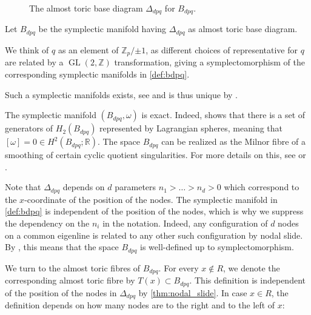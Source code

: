 \documentclass[AIF,Unicode,manuscript]{cedram}
\DeclareMathOperator{\GL}{GL}
\begin{document}
\begin{figure}
\centering
{}   
\caption{The almost toric base diagram $Δ_{dpq}$ for $B_{dpq}$.}
\label{fig:Bdpq_moment_image}
\end{figure}

\begin{definition}
    \label{def:bdpq}
    Let $B_{dpq}$ be the symplectic manifold having $\Delta_{dpq}$ as almost toric base diagram.
\end{definition}

We think of $q$ as an element of $ℤ_p/{±1}$, as different choices of representative for $q$ are related by a $\GL(2,ℤ)$ transformation, giving a symplectomorphism of the corresponding symplectic manifolds in \cref{def:bdpq}.

Such a symplectic manifolds exists, see \cite[Section 7.4]{evans2021atfs} and is thus unique by \cite[Theorem 8.5]{evans2021atfs}. 

\begin{remark}
    The symplectic manifold $(B_{dpq}, \omega)$ is exact.
    Indeed, \cite[Lemma 7.11]{evans2021atfs} shows that there is a set of generators of $H_2(B_{dpq})$ represented by Lagrangian spheres, meaning that $[\omega] = 0 \in H^2(B_{dpq};\mathbb{R})$.
The space $B_{dpq}$ can be realized as the Milnor fibre of a smoothing of certain cyclic quotient singularities.
For more details on this, see \cite[Section 7.4]{evans2021atfs} or \cite{Eva19}.
\end{remark}

Note that $\Delta_{dpq}$ depends on $d$ parameters $n_1>\ldots>n_d > 0$ which correspond to the $x$-coordinate of the position of the nodes.
The symplectic manifold in \cref{def:bdpq} is independent of the position of the nodes, which is why we suppress the dependency on the $n_i$ in the notation.
Indeed, any configuration of $d$ nodes on a common eigenline is related to any other such configuration by nodal slide.
By \cite[Theorem 8.10]{evans2021atfs}, this means that the space $B_{dpq}$ is well-defined up to symplectomorphism.

We turn to the almost toric fibres of $B_{dpq}$.
For every $x \notin R$, we denote the corresponding almost toric fibre by $T(x) \subset B_{dpq}$.
This definition is independent of the position of the nodes in $\Delta_{dpq}$ by \cref{thm:nodal_slide}.
In case $x \in R$, the definition depends on how many nodes are to the right and to the left of $x$:
\end{document}
